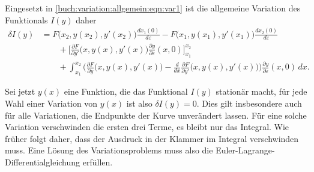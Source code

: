 Eingesetzt in 
\eqref{buch:variation:allgemein:eqn:var1}
ist die allgemeine Variation des Funktionals $I(y)$ daher
\begin{equation}
\begin{aligned}
\delta I(y)
&=
F\bigl(x_2,y(x_2),y'(x_2)\bigr)
\frac{dx_1(0)}{d\varepsilon}
-
F\bigl(x_1,y(x_1),y'(x_1)\bigr)
\frac{dx_2(0)}{d\varepsilon}
\\
&\qquad
+
\biggl[
\frac{\partial F}{\partial y'}\bigl(x,y(x),y'(x)\bigr)
\frac{\partial y}{\partial\varepsilon}(x,0)
\biggr]_{x_1}^{x_2}
\\
&\qquad
+
\int_{x_1}^{x_2}
\biggl(
\frac{\partial F}{\partial y}\bigl(x,y(x),y'(x)\bigr)
-
\frac{d}{dx}\frac{\partial F}{\partial y'}\bigl(x,y(x),y'(x)\bigr)
\biggr)
\frac{\partial y}{\partial \varepsilon}(x,0)
\,dx.
\end{aligned}
\label{buch:variation:allgemein:eqn:variation}
\end{equation}

Sei jetzt $y(x)$ eine Funktion, die das Funktional $I(y)$ stationär macht,
für jede Wahl einer Variation von $y(x)$ ist also $\delta I(y)=0$.
Dies gilt insbesondere auch für alle Variationen, die Endpunkte der
Kurve unverändert lassen.
Für eine solche Variation verschwinden die ersten drei Terme, es bleibt
nur das Integral.
Wie früher folgt daher, dass der Ausdruck in der Klammer im Integral
verschwinden muss.
Eine Lösung des Variationsproblems muss also die
Euler-Lagrange-Differentialgleichung erfüllen.


